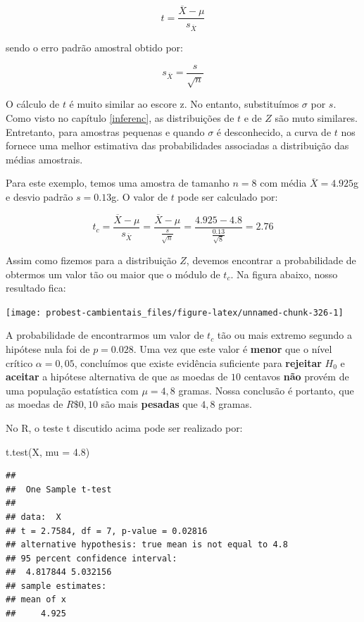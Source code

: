 \documentclass[
]{book}
\newenvironment{Shaded}{\begin{snugshade}}{\end{snugshade}}
\newcommand{\AttributeTok}[1]{\textcolor[rgb]{0.77,0.63,0.00}{#1}}
\newcommand{\FloatTok}[1]{\textcolor[rgb]{0.00,0.00,0.81}{#1}}
\newcommand{\FunctionTok}[1]{\textcolor[rgb]{0.00,0.00,0.00}{#1}}
\newcommand{\NormalTok}[1]{#1}
\begin{document}
\[t = \frac{\overline{X} - \mu}{s_{\overline{X}}}\]

sendo o erro padrão amostral obtido por:

\[s_{\overline{X}} = \frac{s}{\sqrt{n}}\]

O cálculo de \(t\) é muito similar ao escore z. No entanto, substituímos \(\sigma\) por \(s\). Como visto no capítulo \ref{inferenc}, as distribuições de \(t\) e de \(Z\) são muto similares. Entretanto, para amostras pequenas e quando \(\sigma\) é desconhecido, a curva de \(t\) nos fornece uma melhor estimativa das probabilidades associadas a distribuição das médias amostrais.

Para este exemplo, temos uma amostra de tamanho \(n = 8\) com média \(\overline{X} = 4.925\)g e desvio padrão \(s = 0.13\)g. O valor de \(t\) pode ser calculado por:

\[t_{c} = \frac{\overline{X} - \mu}{s_{\overline{X}}} = \frac{\overline{X} - \mu}{\frac{s}{\sqrt{n}}} = \frac{4.925  - 4.8}{\frac{0.13}{\sqrt{8}}} = 2.76\]

Assim como fizemos para a distribuição \(Z\), devemos encontrar a probabilidade de obtermos um valor tão ou maior que o módulo de \(t_c\). Na figura abaixo, nosso resultado fica:

\begin{center}\texttt{[image: probest-cambientais\_files/figure-latex/unnamed-chunk-326-1]} \end{center}

A probabilidade de encontrarmos um valor de \(t_c\) tão ou mais extremo segundo a hipótese nula foi de \(p = 0.028\). Uma vez que este valor é \textbf{menor} que o nível crítico \(\alpha = 0,05\), concluímos que existe evidência suficiente para \textbf{rejeitar} \(H_0\) e \textbf{aceitar} a hipótese alternativa de que as moedas de \(10\) centavos \textbf{não} provém de uma população estatística com \(\mu = 4,8\) gramas. Nossa conclusão é portanto, que as moedas de \(R\$ 0,10\) são mais \textbf{pesadas} que \(4,8\) gramas.

No R, o teste t discutido acima pode ser realizado por:

\begin{Shaded}
\begin{Highlighting}[]
\FunctionTok{t.test}\NormalTok{(X, }\AttributeTok{mu =} \FloatTok{4.8}\NormalTok{)}
\end{Highlighting}
\end{Shaded}

\begin{verbatim}
## 
##  One Sample t-test
## 
## data:  X
## t = 2.7584, df = 7, p-value = 0.02816
## alternative hypothesis: true mean is not equal to 4.8
## 95 percent confidence interval:
##  4.817844 5.032156
## sample estimates:
## mean of x 
##     4.925
\end{verbatim}
\end{document}
